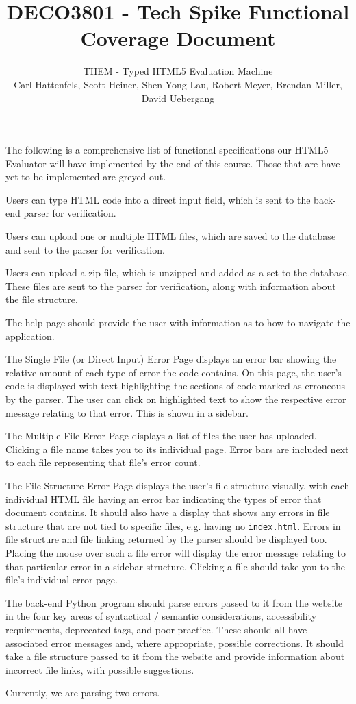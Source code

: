 \documentclass[10pt]{article}
\title{\bf \large DECO3801 - Tech Spike Functional Coverage Document}
\author{\normalsize THEM - Typed HTML5 Evaluation Machine \\ \normalsize Carl Hattenfels, Scott Heiner, Shen Yong Lau, Robert Meyer, Brendan Miller, David Uebergang}
\date{}
\begin{document}
\maketitle
The following is a comprehensive list of functional specifications our HTML5 Evaluator will have implemented by the end of this course. Those that are have yet to be implemented are greyed out.

\begin{itemize}
\item Users can type HTML code into a direct input field, which is sent to the back-end parser for verification.
\item Users can upload one or multiple HTML files, which are saved to the database and sent to the parser for verification.
\item Users can upload a zip file, which is unzipped and added as a set to the database. These files are sent to the parser for verification, {\color{gray} along with information about the file structure.}
{\color{gray}\item The help page should provide the user with information as to how to navigate the application.}
\item The Single File (or Direct Input) Error Page displays an error bar showing the relative amount of each type of error the code contains. On this page, the user's code is displayed with text highlighting the sections of code marked as erroneous by the parser.
The user can click on highlighted text to show the respective error message relating to that error. This is shown in a sidebar. %
\item The Multiple File Error Page displays a list of files the user has uploaded. Clicking a file name takes you to its individual page. {\color{gray} Error bars are included next to each file representing that file's error count.}
{\color{gray}\item The File Structure Error Page displays the user's file structure visually, with each individual HTML file having an error bar indicating the types of error that document contains. It should also have a display that shows any errors in file structure that are not tied to specific files, e.g. having no \verb'index.html'. Errors in file structure and file linking returned by the parser should be displayed too. Placing the mouse over such a file error will display the error message relating to that particular error in a sidebar structure. Clicking a file should take you to the file's individual error page.}
{\color{gray}\item The back-end Python program should parse errors passed to it from the website in the four key areas of syntactical / semantic considerations, accessibility requirements, deprecated tags, and poor practice. These should all have associated error messages and, where appropriate, possible corrections. It should take a file structure passed to it from the website and provide information about incorrect file links, with possible suggestions.} Currently, we are parsing two errors.
\end{itemize}
\end{document}
